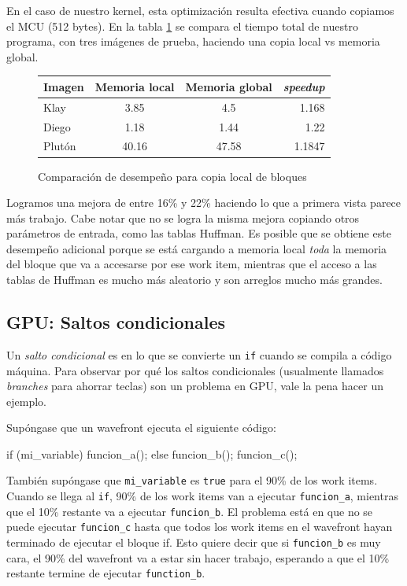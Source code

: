{En el caso de nuestro kernel, esta optimización resulta efectiva cuando
copiamos el \gls{MCU} (512 bytes). En la tabla \ref{table:gpucopy} se compara el tiempo
total de nuestro programa, con tres imágenes de prueba, haciendo una copia
local vs memoria global.

\begin{figure}[h]
    \begin{tabular}{ |l c c r| }
        \hline
        Imagen & Memoria local & Memoria global & \emph{speedup} \\
        \hline
        Klay & 3.85 & 4.5 & 1.168 \\
        Diego & 1.18 & 1.44 & 1.22 \\
        Plutón & 40.16 & 47.58 & 1.1847 \\
        \hline
    \end{tabular}
    \caption{Comparación de desempeño para copia local de bloques}
    \label{table:gpucopy}
\end{figure}

Logramos una mejora de entre 16\% y 22\% haciendo lo que a primera vista parece
más trabajo. Cabe notar que no se logra la misma mejora copiando otros
parámetros de entrada, como las tablas Huffman. Es posible que se obtiene este
desempeño adicional porque se está cargando a memoria local \emph{toda} la
memoria del bloque que va a accesarse por ese work item, mientras que el acceso
a las tablas de Huffman es mucho más aleatorio y son arreglos mucho más
grandes.

\subsection{GPU: Saltos condicionales}

Un \emph{ salto condicional } es en lo que se convierte un \verb+if+ cuando
se compila a código máquina. Para observar por qué los saltos condicionales
(usualmente llamados \emph{branches} para ahorrar teclas) son un problema en
GPU, vale la pena hacer un ejemplo.

Supóngase que un wavefront ejecuta el siguiente código:

\begin{code}[language=C][h]
    if (mi_variable) {
        funcion_a();
    } else {
        funcion_b();
    }
    funcion_c();
\end{code}

También supóngase que \verb+mi_variable+ es \verb+true+ para el 90\% de los work
items.  Cuando se llega al \verb+if+, 90\% de los work items van a ejecutar
\verb+funcion_a+, mientras que el 10\% restante va a ejecutar \verb+funcion_b+.
El problema está en que no se puede ejecutar \verb+funcion_c+ hasta que todos
los work items en el wavefront hayan terminado de ejecutar el bloque if. Esto
quiere decir que si \verb+funcion_b+ es muy cara, el 90\% del wavefront va a
estar sin hacer trabajo, esperando a que el 10\% restante termine de ejecutar
\verb+function_b+.

}
